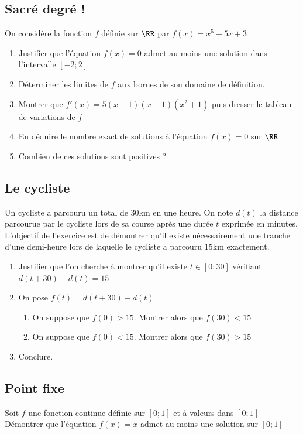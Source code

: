 \documentclass[oneside,12pt]{article}          %
\begin{document}
\subsection{Sacré degré !}
On considère la fonction $f$ définie sur $\RR$ par $f(x)=x^5-5x+3$
\begin{enumerate}
    \item Justifier que l'équation $f(x)=0$ admet au moins une solution dans l'intervalle $[-2;2]$
    \item Déterminer les limites de $f$ aux bornes de son domaine de définition.
    \item Montrer que $f'(x)=5(x+1)(x-1)(x^2+1)$ puis dresser le tableau de variations de $f$
    \item En déduire le nombre exact de solutions à l'équation $f(x)=0$ sur $\RR$
    \item Combien de ces solutions sont positives ?
\end{enumerate}



\subsection{Le cycliste}
Un cycliste a parcouru un total de 30km en une heure. On note $d(t)$ la distance parcourue par le cycliste lors de sa course après une durée $t$ exprimée en minutes.\\
L'objectif de l'exercice est de démontrer qu'il existe nécessairement une tranche d'une demi-heure lors de laquelle le cycliste a parcouru 15km exactement.
\begin{enumerate}
	\item Justifier que l'on cherche à montrer qu'il existe $t\in[0;30]$ vérifiant $d(t+30)-d(t)=15$
	\item On pose $f(t)=d(t+30)-d(t)$
	\begin{enumerate}
		\item On suppose que $f(0)>15$. Montrer alors que $f(30)<15$
		\item On suppose que $f(0)<15$. Montrer alors que $f(30)>15$
	\end{enumerate}
	\item Conclure.
\end{enumerate}



\subsection{Point fixe}
Soit $f$ une fonction continue définie sur $[0;1]$ et à valeurs dans $[0;1]$\\
Démontrer que l'équation $f(x)=x$ admet au moins une solution sur $[0;1]$
\end{document}
